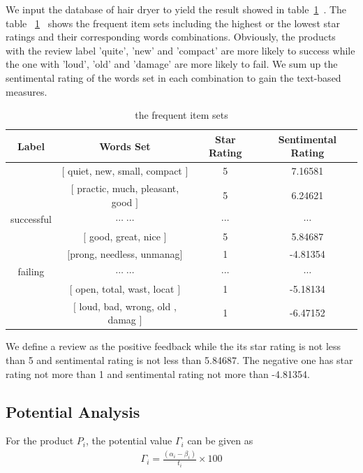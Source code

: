 \documentclass[12pt]{article}%
\begin{document}
We input the database of hair dryer to yield  the result showed in table~\ref{conb}~. The table ~\ref{conb}~ shows the frequent item sets including the highest or the lowest star ratings and their corresponding words combinations. Obviously, the products with the review label 'quite', 'new' and 'compact' are more likely to success while the one with 'loud', 'old' and 'damage' are more likely to fail. We sum up the sentimental rating of the words set in each combination to gain the text-based measures.

\begin{table}[H]
	\centering
	\caption{the frequent item sets}	
	\begin{tabular}{c|ccc}
		\toprule[1.5pt]
		\multicolumn{1}{m{2cm}}{\centering Label} &
		\multicolumn{1}{m{6cm}}{\centering Words Set} & \multicolumn{1}{m{2cm}}{\centering Star Rating}&
		\multicolumn{1}{m{2cm}}{\centering  Sentimental Rating}\\
		\midrule[1pt]
		&$\big [$ quiet, new, small, compact $\big ]$ &5&7.16581\\
				&$\big [$ practic, much, pleasant, good $\big ]$ &5&6.24621\\
			successful	 	&$\cdots$ $\cdots$&$\cdots$&$\cdots$\\
	 	&$\big [$ good, great, nice $\big ]$ &5&5.84687\\
				\midrule[1pt]
		&$\big [$prong, needless, unmanag$\big ]$ &1&-4.81354\\
		failing				 	&$\cdots$ $\cdots$&$\cdots$&$\cdots$\\
		&$\big [$ open, total, wast, locat $\big ]$ &1&-5.18134\\
				&$\big [$ loud, bad, wrong, old , damag $\big ]$ &1&-6.47152\\
		\bottomrule[1.6pt]
	\end{tabular}\label{conb}
\end{table}
 We define a review as the positive feedback while the its star rating is not less than 5 and sentimental rating is not less than 5.84687. The negative one has star rating not more than 1 and sentimental rating not more than -4.81354.

\subsection{Potential Analysis}
For the product $P_{i}$, the potential value $\Gamma_{i}$ can be given as 
\begin{gather}
\Gamma_{i}=\frac{(\alpha_{i}-\beta_{i})}{t_{i}}\times 100
\end{gather}
\end{document}
